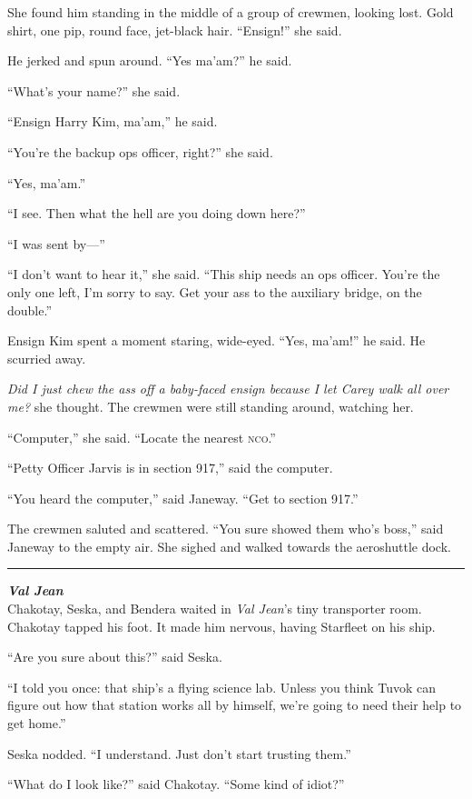 \documentclass[twoside,letterpaper,12pt]{memoir}
\begin{document}
She found him standing in the middle of a group of crewmen, looking lost. Gold shirt, one pip, round face, jet-black hair. ``Ensign!'' she said.

He jerked and spun around. ``Yes ma'am?'' he said.

``What's your name?'' she said.

``Ensign Harry Kim, ma'am,'' he said.

``You're the backup ops officer, right?'' she said.

``Yes, ma'am.''

``I see. Then what the hell are you doing down here?''

``I was sent by---''

``I don't want to hear it,'' she said. ``This ship needs an ops officer. You're the only one left, I'm sorry to say. Get your ass to the auxiliary bridge, on the double.''

Ensign Kim spent a moment staring, wide-eyed. ``Yes, ma'am!'' he said. He scurried away.

\textit{Did I just chew the ass off a baby-faced ensign because I let Carey walk all over me?} she thought. The crewmen were still standing around, watching her.

``Computer,'' she said. ``Locate the nearest \textsc{nco}.''

``Petty Officer Jarvis is in section 917,'' said the computer.

``You heard the computer,'' said Janeway. ``Get to section 917.''

The crewmen saluted and scattered. ``You sure showed them who's boss,'' said Janeway to the empty air. She sighed and walked towards the aeroshuttle dock.

\fancybreak{\rule{3cm}{0.4 pt}}
\noindent\textit{\textbf{Val Jean}}\\

Chakotay, Seska, and Bendera waited in \textit{Val Jean}'s tiny transporter room. Chakotay tapped his foot. It made him nervous, having Starfleet on his ship.

``Are you sure about this?'' said Seska.

``I told you once: that ship's a flying science lab. Unless you think Tuvok can figure out how that station works all by himself, we're going to need their help to get home.''

Seska nodded. ``I understand. Just don't start trusting them.''

``What do I look like?'' said Chakotay. ``Some kind of idiot?''
\end{document}
